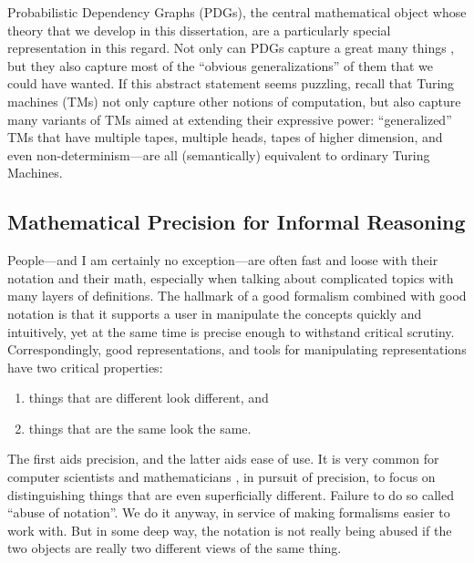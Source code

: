 Probabilistic Dependency Graphs (PDGs), the central mathematical object whose theory that we develop in this dissertation, are a particularly special representation in this regard. 
Not only can PDGs capture a great many things 
\unskip, but they also capture most of the ``obvious generalizations'' of them that we could have wanted. 
If this abstract statement seems puzzling, recall that Turing machines (TMs) not only capture other notions of computation, but also capture many variants of TMs aimed at extending their expressive power: ``generalized'' TMs that have multiple tapes, multiple heads, tapes of higher dimension, and even non-determinism---are all (semantically) equivalent to ordinary Turing Machines. 


\subsection{Mathematical Precision for Informal Reasoning}


People---and I am certainly no exception---are often fast and loose with their notation and their math, especially when talking about complicated topics with many layers of definitions. 
%
The hallmark of a good formalism combined with good notation is that it supports a user in manipulate the concepts quickly and intuitively, yet at the same time is precise enough to withstand critical scrutiny.
%
Correspondingly, good representations, and tools for manipulating representations 
    have two critical properties:
\begin{enumerate}
    \item things that are different look different, and
    \item things that are the same look the same. 
\end{enumerate}
The first aids precision, and the latter aids ease of use. 
It is very common for computer scientists and mathematicians 
    \unskip,
    in pursuit of precision,
    to focus on distinguishing things that are even superficially different.  
Failure to do so called ``abuse of notation''. 
%
We do it anyway, in service of making formalisms easier to work with. 
But in some deep way, the notation is not really being abused if the two objects are really two different views of the same thing.

